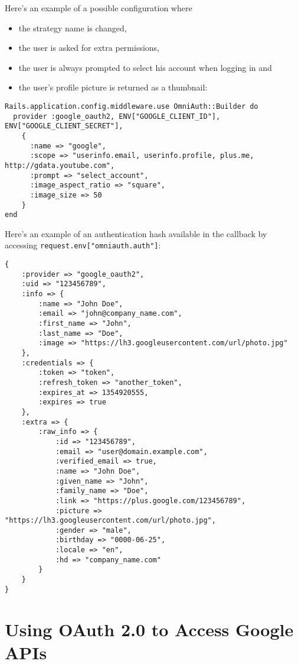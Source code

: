 Here's an example of a possible configuration where 

\begin{itemize}
\item
the strategy name is changed, 
\item
the user is asked for extra permissions, 
\item
the user is always
prompted to select his account when logging in and 
\item
the user's profile
picture is returned as a thumbnail:
\end{itemize}

\begin{verbatim}
Rails.application.config.middleware.use OmniAuth::Builder do
  provider :google_oauth2, ENV["GOOGLE_CLIENT_ID"], ENV["GOOGLE_CLIENT_SECRET"],
    {
      :name => "google",
      :scope => "userinfo.email, userinfo.profile, plus.me, http://gdata.youtube.com",
      :prompt => "select_account",
      :image_aspect_ratio => "square",
      :image_size => 50
    }
end
\end{verbatim}


Here's an example of an authentication hash available in the callback
by accessing \verb|request.env["omniauth.auth"]|:

\begin{verbatim}
{
    :provider => "google_oauth2",
    :uid => "123456789",
    :info => {
        :name => "John Doe",
        :email => "john@company_name.com",
        :first_name => "John",
        :last_name => "Doe",
        :image => "https://lh3.googleusercontent.com/url/photo.jpg"
    },
    :credentials => {
        :token => "token",
        :refresh_token => "another_token",
        :expires_at => 1354920555,
        :expires => true
    },
    :extra => {
        :raw_info => {
            :id => "123456789",
            :email => "user@domain.example.com",
            :verified_email => true,
            :name => "John Doe",
            :given_name => "John",
            :family_name => "Doe",
            :link => "https://plus.google.com/123456789",
            :picture => "https://lh3.googleusercontent.com/url/photo.jpg",
            :gender => "male",
            :birthday => "0000-06-25",
            :locale => "en",
            :hd => "company_name.com"
        }
    }
}
\end{verbatim}


\section{Using OAuth 2.0 to Access Google APIs}


